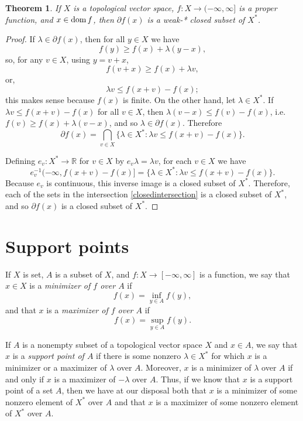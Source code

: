 \documentclass{article}
\newcommand{\dom}{\ensuremath\mathrm{dom}\,}
\newtheorem{theorem}{Theorem}
\theoremstyle{definition}
\begin{document}
\begin{theorem}
If $X$ is a topological vector space, $f:X \to (-\infty,\infty]$ is a proper function, and  $x \in \dom f$, then
$\partial f(x)$ is a weak-* closed  subset of $X^*$.
\label{weakstarcompact}
\end{theorem}
\begin{proof}
If $\lambda \in \partial f(x)$, then for all $y \in X$ we have
\[
f(y) \geq f(x)+\lambda (y-x),
\]
so, for any $v \in X$, using $y=v+x$,
\[
f(v+x) \geq f(x)+\lambda v,
\]
or,
\[
\lambda v \leq f(x+v)-f(x);
\]
this makes sense because $f(x)$ is finite.
On the other hand, let $\lambda \in X^*$. If $\lambda v \leq f(x+v)-f(x)$ for all $v \in X$, then $\lambda(v-x) \leq f(v)-f(x)$, i.e.
$f(v) \geq f(x)+\lambda(v-x)$, and so $\lambda \in \partial f(x)$. Therefore
\begin{equation}
\partial f(x) = \bigcap_{v \in X} \{\lambda \in X^*: \lambda v \leq f(x+v)-f(x)\}.
\label{closedintersection}
\end{equation}

Defining $e_v:X^* \to \mathbb{R}$ for $v \in X$ by $e_v\lambda=\lambda v$, 
for each $v \in X$ we have
\[
e_v^{-1}(-\infty,f(x+v)-f(x)] = \{\lambda \in X^*:  \lambda v \leq f(x+v)-f(x)\}.
\]
Because $e_v$ is continuous, this inverse image is a closed subset of $X^*$. Therefore, each of the sets in the intersection \eqref{closedintersection} is a closed subset of
$X^*$, and so
$\partial f(x)$ is a closed subset of $X^*$.
\end{proof}



\section{Support points}
If $X$ is set, $A$ is a subset of $X$,  and $f:X \to [-\infty,\infty]$ is a function, we say that $x \in X$ is a {\em minimizer of $f$ over $A$} if 
\[
f(x) = \inf_{y \in A} f(y),
\]
and that $x$ is a {\em maximizer  of $f$ over $A$} if
\[
f(x) = \sup_{y \in A} f(y).
\]

If $A$ is a nonempty subset of a topological vector space $X$ and $x \in A$, 
we say that $x$ is a {\em support point of $A$} if there is some nonzero
 $\lambda \in X^*$  for which $x$ is a minimizer or a maximizer of $\lambda$ over $A$. Moreover,
$x$ is a minimizer of $\lambda$ over $A$ if and only if  $x$ is a maximizer of $-\lambda$ over $A$.
Thus, if we know that $x$ is a support point of a set $A$, then we have at our disposal both that $x$ is a minimizer of some nonzero element of $X^*$ over $A$ and that $x$ is a maximizer
of some nonzero element of $X^*$ over $A$.
\end{document}
